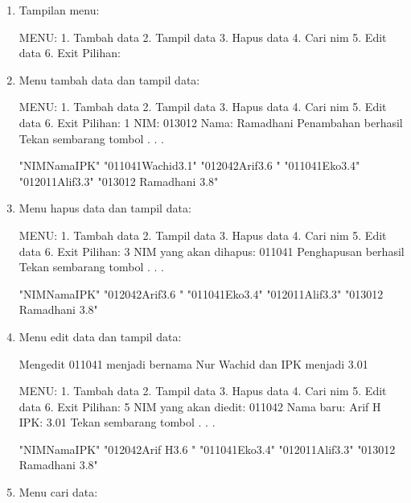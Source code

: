 \begin{enumerate}

\item
Tampilan menu:

 \begin{lcverbatim}
MENU:
1. Tambah data
2. Tampil data
3. Hapus data
4. Cari nim
5. Edit data
6. Exit
Pilihan:
 \end{lcverbatim}

\item
Menu tambah data dan tampil data:

 \begin{lcverbatim}
 MENU:
 1. Tambah data
 2. Tampil data
 3. Hapus data
 4. Cari nim
 5. Edit data
 6. Exit
 Pilihan: 1
 NIM: 013012
 Nama: Ramadhani
 Penambahan berhasil
 Tekan sembarang tombol . . .
 \end{lcverbatim}

\begin{lcverbatim}
"NIMNamaIPK" 
"011041Wachid3.1" 
"012042Arif3.6 "
"011041Eko3.4"
"012011Alif3.3" 
"013012 Ramadhani 3.8" 
\end{lcverbatim}
\item
Menu hapus data dan tampil data:

 \begin{lcverbatim}
MENU:
1. Tambah data
2. Tampil data
3. Hapus data
4. Cari nim
5. Edit data
6. Exit
Pilihan: 3
NIM yang akan dihapus: 011041
Penghapusan berhasil
Tekan sembarang tombol . . .
\end{lcverbatim}
\begin{lcverbatim}
"NIMNamaIPK" 
"012042Arif3.6 "
"011041Eko3.4"
"012011Alif3.3" 
"013012 Ramadhani 3.8" 
\end{lcverbatim}
 
\item
Menu edit data dan tampil data: 

Mengedit 011041 menjadi bernama
Nur Wachid dan IPK menjadi 3.01

\begin{lcverbatim}
MENU:
1. Tambah data
2. Tampil data
3. Hapus data
4. Cari nim
5. Edit data
6. Exit
Pilihan: 5
NIM yang akan diedit: 011042
Nama baru: Arif H
IPK: 3.01
Tekan sembarang tombol . . .
\end{lcverbatim}

\begin{lcverbatim}
"NIMNamaIPK" 
"012042Arif H3.6 "
"011041Eko3.4"
"012011Alif3.3" 
"013012 Ramadhani 3.8" 
\end{lcverbatim}
\item
Menu cari data:


\end{enumerate}
